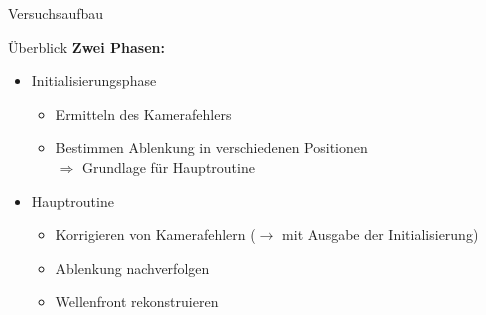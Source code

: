 \begin{frame}{Versuchsaufbau}
\nocite{Ber12}
\nocite{Ber13}
\nocite{Ber15}
{\scriptsize {}}
\end{frame}

\begin{frame}{Überblick}
\textbf{Zwei Phasen:}
\begin{itemize}
	\item Initialisierungsphase
	\begin{itemize}
		\item Ermitteln des Kamerafehlers
		\item Bestimmen Ablenkung in verschiedenen Positionen \\
			$\Rightarrow$ Grundlage für Hauptroutine
	\end{itemize}
	\item<2-> Hauptroutine
	\begin{itemize}
		\item Korrigieren von Kamerafehlern ($ \rightarrow $ mit Ausgabe der Initialisierung)
		\item Ablenkung nachverfolgen
		\item Wellenfront rekonstruieren
	\end{itemize}
\end{itemize}
\end{frame}

